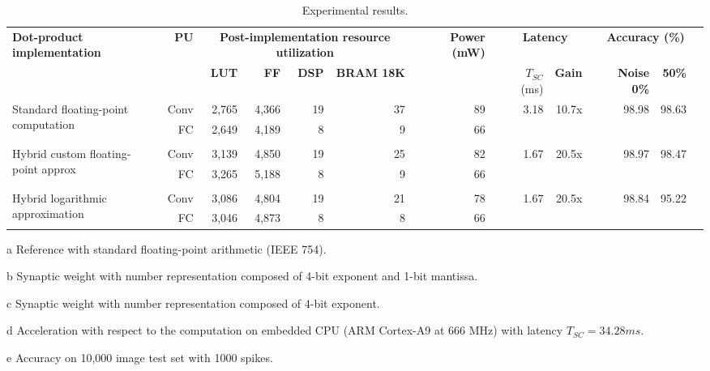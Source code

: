 \begin{table}[!t]
	\begin{threeparttable}
		\centering
		\caption{Experimental results.}\label{tab:results}
		\scriptsize
		\begin{tabular}{lrrrrrrrrrrrrrr}\toprule
			\multirow{2}{*}{\textbf{Dot-product implementation}} &\multirow{2}{*}{\textbf{PU}} &\multicolumn{4}{c}{\textbf{Post-implementation resource utilization}} & &\multirow{2}{*}{\textbf{Power (mW)}} & &\multicolumn{2}{c}{\textbf{Latency}} & &\multicolumn{2}{c}{\textbf{Accuracy (\%)\tnote{e}}} \\\cmidrule{3-6}\cmidrule{10-11}\cmidrule{13-14}
			& &\textbf{LUT} &\textbf{FF} &\textbf{DSP} &\textbf{BRAM 18K} & & & &$T_{SC}$ (ms) &\textbf{Gain\tnote{d}} & &\textbf{Noise 0\%} &\textbf{50\%} \\\midrule
			\multirow{2}{*}{Standard floating-point computation\tnote{a}} &Conv &2,765 &4,366 &19 &37 & &89 & &\multirow{2}{*}{3.18} &\multirow{2}{*}{10.7x} & &\multirow{2}{*}{98.98} &\multirow{2}{*}{98.63} \\
			&FC &2,649 &4,189 &8 &9 & &66 & & & & & & \\
			& & & & & & & & & & & & & \\
			\multirow{2}{*}{Hybrid custom floating-point approx\tnote{b}} &Conv &3,139 &4,850 &19 &25 & &82 & &\multirow{2}{*}{1.67} &\multirow{2}{*}{20.5x} & &\multirow{2}{*}{98.97} &\multirow{2}{*}{98.47} \\
			&FC &3,265 &5,188 &8 &9 & &66 & & & & & & \\
			& & & & & & & & & & & & & \\
			\multirow{2}{*}{Hybrid logarithmic approximation\tnote{c}} &Conv &3,086 &4,804 &19 &21 & &78 & &\multirow{2}{*}{1.67} &\multirow{2}{*}{20.5x} & &\multirow{2}{*}{98.84} &\multirow{2}{*}{95.22} \\
			&FC &3,046 &4,873 &8 &8 & &66 & & & & & & \\
			\bottomrule
		\end{tabular}
		\begin{tablenotes}
			\scriptsize
			\item[a] Reference with standard floating-point arithmetic (IEEE 754).
			\item[b] Synaptic weight with number representation composed of 4-bit exponent and 1-bit mantissa.
			\item[c] Synaptic weight with number representation composed of 4-bit exponent.
			\item[d] Acceleration with respect to the computation on embedded CPU (ARM Cortex-A9 at 666 MHz) with latency $T_{SC} = 34.28 ms$.
			\item[e] Accuracy on 10,000 image test set with 1000 spikes.
		\end{tablenotes}
	\end{threeparttable}
\end{table}

